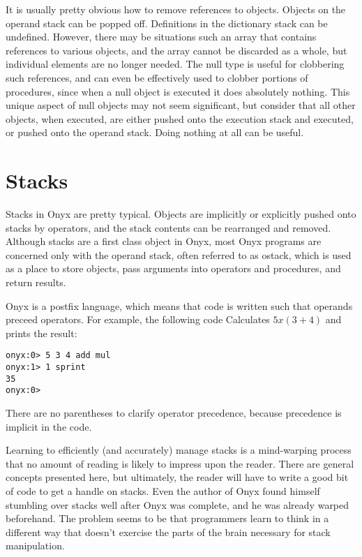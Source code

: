 It is usually pretty obvious how to remove references to objects.  Objects on
the operand stack can be popped off.  Definitions in the dictionary stack can be
undefined.  However, there may be situations such an array that contains
references to various objects, and the array cannot be discarded as a whole, but
individual elements are no longer needed.  The null type is useful for
clobbering such references, and can even be effectively used to clobber portions
of procedures, since when a null object is executed it does absolutely nothing.
This unique aspect of null objects may not seem significant, but consider that
all other objects, when executed, are either pushed onto the execution stack and
executed, or pushed onto the operand stack.  Doing nothing at all can be useful.

\section{Stacks}

Stacks in Onyx are pretty typical.  Objects are implicitly or explicitly pushed
onto stacks by operators, and the stack contents can be rearranged and removed.
Although stacks are a first class object in Onyx, most Onyx programs are
concerned only with the operand stack, often referred to as ostack, which is
used as a place to store objects, pass arguments into operators and procedures,
and return results.

Onyx is a postfix language, which means that code is written such that operands
preceed operators.  For example, the following code Calculates $5 x (3 + 4)$ and
prints the result:

\begin{verbatim}
onyx:0> 5 3 4 add mul
onyx:1> 1 sprint
35
onyx:0>
\end{verbatim}

There are no parentheses to clarify operator precedence, because precedence is
implicit in the code.

Learning to efficiently (and accurately) manage stacks is a mind-warping process
that no amount of reading is likely to impress upon the reader.  There are
general concepts presented here, but ultimately, the reader will have to write
a good bit of code to get a handle on stacks.  Even the author of Onyx found
himself stumbling over stacks well after Onyx was complete, and he was already
warped beforehand.  The problem seems to be that programmers learn to think in a
different way that doesn't exercise the parts of the brain necessary for stack
manipulation.  

